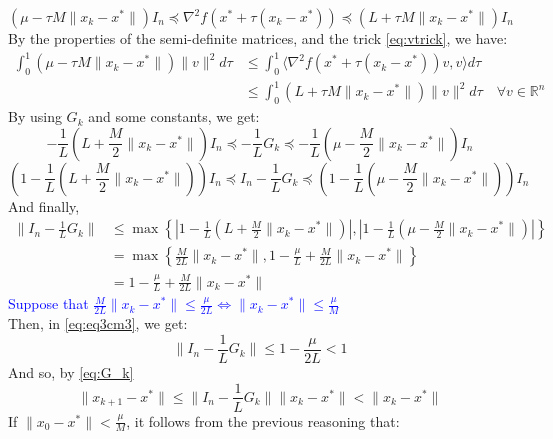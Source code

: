 \documentclass[12pt, openany]{report}
\newcommand{\R}{\mathbb{R}}
\theoremstyle{definition}
\begin{document}
\begin{equation*}
	(\mu - \tau M \|x_k -x^*\|)I_n \preceq \nabla^2f(x^*+\tau(x_k-x^*)) \preceq (L + \tau M \|x_k -x^*\|) I_n 
\end{equation*}
By the properties of the semi-definite matrices, and the trick \eqref{eq:vtrick}, we have:
\begin{equation}
	\begin{aligned}
		\int_{0}^{1} (\mu - \tau M \|x_k -x^*\|) \|v\|^2 d\tau &\leq \int_{0}^{1} \langle \nabla^2f(x^*+\tau(x_k-x^*)) v,v \rangle d\tau\\ 
		&\leq \int_{0}^{1} (L + \tau M \|x_k -x^*\|) \|v\|^2 d\tau \quad \forall v \in \R^n
	\end{aligned}
\end{equation}
By using $G_k$ and some constants, we get:
\begin{equation}
	-\frac{1}{L}(L+\frac{M}{2}\|x_k -x^*\|)I_n \preceq - \frac{1}{L} G_k \preceq -\frac{1}{L}(\mu - \frac{M}{2}\|x_k -x^*\|)I_n
\end{equation}
\begin{equation}
	\left(1-\frac{1}{L}(L+\frac{M}{2}\|x_k -x^*\|)\right)I_n \preceq I_n - \frac{1}{L}G_k \preceq \left(1-\frac{1}{L}(\mu - \frac{M}{2}\|x_k -x^*\|)\right)I_n
\end{equation}
And finally, 
\begin{equation}\label{eq:eq3cm3}
	\begin{aligned}
		\|I_n - \frac{1}{L}G_k\| &\leq \max\left\{\left|1-\frac{1}{L}(L + \frac{M}{2}\|x_k -x^*\|)\right|,\left|1-\frac{1}{L}(\mu - \frac{M}{2}\|x_k -x^*\|)\right|\right\}\\
		&= \max\left\{\frac{M}{2L}\|x_k -x^*\|, 1-\frac{\mu}{L}+\frac{M}{2L}\|x_k -x^*\|\right\}\\
		&= 1-\frac{\mu}{L}+\frac{M}{2L}\|x_k -x^*\|
	\end{aligned}
\end{equation}
\textcolor{blue}{Suppose that $\frac{M}{2L} \|x_k -x^*\| \leq \frac{\mu}{2L} \Longleftrightarrow \|x_k -x^*\| \leq \frac{\mu}{M}$}\\
Then, in \eqref{eq:eq3cm3}, we get:
\begin{equation}
	\|I_n - \frac{1}{L}G_k\| \leq 1-\frac{\mu}{2L} < 1
\end{equation}
And so, by \eqref{eq:G_k}
\begin{equation}\label{eq:bound_by_G_k}
	\|x_{k+1} - x^*\| \leq \|I_n - \frac{1}{L}G_k\| \|x_k -x^*\| < \|x_k -x^*\|
\end{equation}
If $\|x_0 - x^* \|< \frac{\mu}{M}$, it follows from the previous reasoning that:
\end{document}

